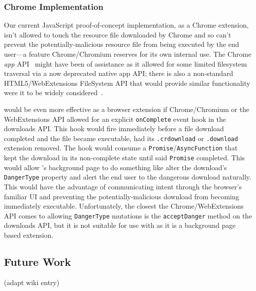 \subsubsection{Chrome Implementation}

Our current JavaScript proof-of-concept implementation, as a Chrome extension,
isn't allowed to touch the resource file downloaded by Chrome and so can't
prevent the potentially-malicious resource file from being executed by the end
user—a feature Chrome/Chromium reserves for its own internal use. The Chrome
\textit{app} API~\cite{AppAPI} might have been of assistance as it allowed for
some limited filesystem traversal via a now deprecated native app API; there is
also a non-standard HTML5/WebExtensions FileSystem API that would provide
similar functionality were it to be widely considered~\cite{deadSpec}.

\SYSTEM{} would be even more effective as a browser extension if Chrome/Chromium
or the WebExtensions API allowed for an explicit \texttt{onComplete} event hook
in the downloads API. This hook would fire immediately before a file download
completed and the file became executable, \ie had its \texttt{.crdownload} or
\texttt{.download} extension removed. The hook would consume a
\texttt{Promise}/\texttt{AsyncFunction} that kept the download in its
non-complete state until said \texttt{Promise} completed. This would allow
\SYSTEM{}'s background page to do something like alter the download's
\texttt{DangerType} property and alert the end user to the dangerous download
naturally. This would have the advantage of communicating intent through the
browser's familiar UI and preventing the potentially-malicious download from
becoming immediately executable. Unfortunately, the closest the
Chrome/WebExtensions API comes to allowing \texttt{DangerType} mutations is the
\texttt{acceptDanger} method on the downloads API, but it is not suitable for
use with \SYSTEM{} as it is a background page based extension.

\subsection{Future Work}

(adapt wiki entry)
